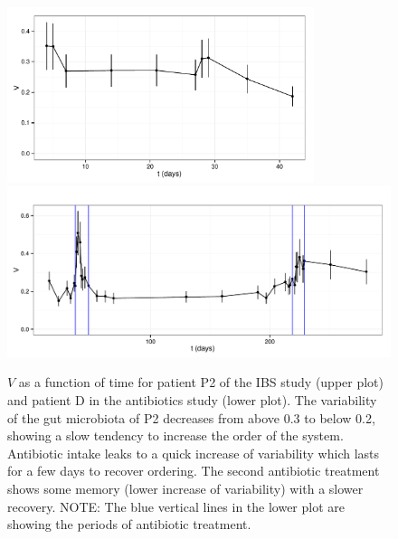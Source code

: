 \begin{figure}
	\centering 
 	\includegraphics[width=0.8\textwidth]{results/sliwin/patP2_IBS.pdf}
  	\includegraphics[width=1.0\textwidth]{results/sliwin/patD_antibio.pdf} 
\caption{$V$ as a function of time for patient P2 of the IBS study\cite{IBS} (upper plot) and patient D in the antibiotics study\cite{antibiotic} (lower plot). The variability 
of the gut microbiota of P2 decreases from above 0.3 to below 0.2, showing a slow tendency to increase the order of the system.  Antibiotic intake leaks to a quick increase of variability which lasts for a few days to recover ordering. The second antibiotic treatment shows some memory (lower increase of variability) with a slower recovery. NOTE: The blue vertical lines in the lower plot are showing the periods of antibiotic treatment.}
\label{fig:tempevo2}
\end{figure}
